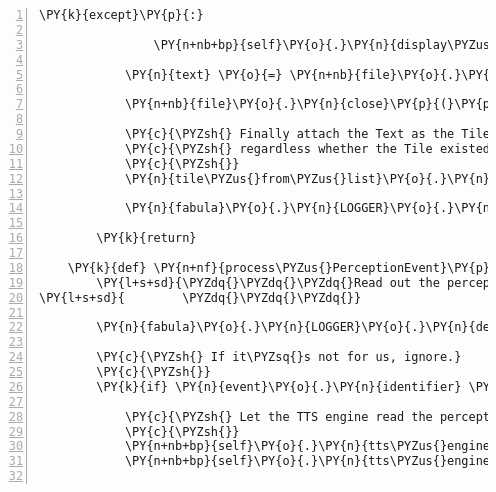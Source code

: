 \begin{Verbatim}[commandchars=\\\{\},numbers=left,firstnumber=1,stepnumber=1]
            \PY{k}{except}\PY{p}{:}

                \PY{n+nb+bp}{self}\PY{o}{.}\PY{n}{display\PYZus{}asset\PYZus{}exception}\PY{p}{(}\PY{n}{event}\PY{o}{.}\PY{n}{entity}\PY{o}{.}\PY{n}{assets}\PY{p}{[}\PY{l+s}{\PYZsq{}}\PY{l+s}{text/plain}\PY{l+s}{\PYZsq{}}\PY{p}{]}\PY{o}{.}\PY{n}{uri}\PY{p}{)}

            \PY{n}{text} \PY{o}{=} \PY{n+nb}{file}\PY{o}{.}\PY{n}{readlines}\PY{p}{(}\PY{p}{)}

            \PY{n+nb}{file}\PY{o}{.}\PY{n}{close}\PY{p}{(}\PY{p}{)}

            \PY{c}{\PYZsh{} Finally attach the Text as the Tile\PYZsq{}s asset, update text}
            \PY{c}{\PYZsh{} regardless whether the Tile existed or not}
            \PY{c}{\PYZsh{}}
            \PY{n}{tile\PYZus{}from\PYZus{}list}\PY{o}{.}\PY{n}{assets}\PY{p}{[}\PY{l+s}{\PYZsq{}}\PY{l+s}{text/plain}\PY{l+s}{\PYZsq{}}\PY{p}{]}\PY{o}{.}\PY{n}{data} \PY{o}{=} \PY{n}{text}

            \PY{n}{fabula}\PY{o}{.}\PY{n}{LOGGER}\PY{o}{.}\PY{n}{debug}\PY{p}{(}\PY{l+s}{\PYZdq{}}\PY{l+s}{changing text for tile at \PYZob{}0\PYZcb{} to \PYZob{}1\PYZcb{}}\PY{l+s}{\PYZdq{}}\PY{o}{.}\PY{n}{format}\PY{p}{(}\PY{n+nb}{str}\PY{p}{(}\PY{n}{event}\PY{o}{.}\PY{n}{location}\PY{p}{)}\PY{p}{,}
                                                                              \PY{n}{tile\PYZus{}from\PYZus{}list}\PY{o}{.}\PY{n}{assets}\PY{p}{[}\PY{l+s}{\PYZsq{}}\PY{l+s}{text/plain}\PY{l+s}{\PYZsq{}}\PY{p}{]}\PY{o}{.}\PY{n}{data}\PY{p}{)}\PY{p}{)}
        \PY{k}{return}

    \PY{k}{def} \PY{n+nf}{process\PYZus{}PerceptionEvent}\PY{p}{(}\PY{n+nb+bp}{self}\PY{p}{,} \PY{n}{event}\PY{p}{)}\PY{p}{:}
        \PY{l+s+sd}{\PYZdq{}\PYZdq{}\PYZdq{}Read out the perception with the text\PYZhy{}to\PYZhy{}speech engine.}
\PY{l+s+sd}{        \PYZdq{}\PYZdq{}\PYZdq{}}

        \PY{n}{fabula}\PY{o}{.}\PY{n}{LOGGER}\PY{o}{.}\PY{n}{debug}\PY{p}{(}\PY{l+s}{\PYZdq{}}\PY{l+s}{called}\PY{l+s}{\PYZdq{}}\PY{p}{)}

        \PY{c}{\PYZsh{} If it\PYZsq{}s not for us, ignore.}
        \PY{c}{\PYZsh{}}
        \PY{k}{if} \PY{n}{event}\PY{o}{.}\PY{n}{identifier} \PY{o}{==} \PY{n+nb+bp}{self}\PY{o}{.}\PY{n}{host}\PY{o}{.}\PY{n}{client\PYZus{}id}\PY{p}{:}

            \PY{c}{\PYZsh{} Let the TTS engine read the perception text}
            \PY{c}{\PYZsh{}}
            \PY{n+nb+bp}{self}\PY{o}{.}\PY{n}{tts\PYZus{}engine}\PY{o}{.}\PY{n}{say}\PY{p}{(}\PY{n}{event}\PY{o}{.}\PY{n}{perception}\PY{p}{)}
            \PY{n+nb+bp}{self}\PY{o}{.}\PY{n}{tts\PYZus{}engine}\PY{o}{.}\PY{n}{runAndWait}\PY{p}{(}\PY{p}{)}


\end{Verbatim}
